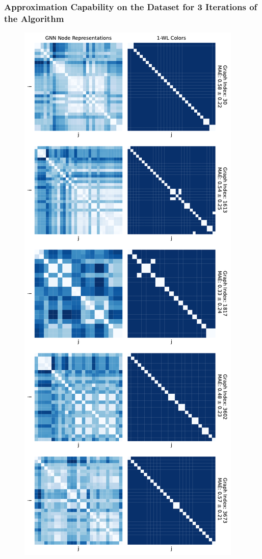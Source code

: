 \subsubsection{Approximation Capability on the \nci Dataset for 3 Iterations of the \wl Algorithm}
\begin{figure}[H]
    \centering
    \begin{minipage}[b]{0.45992852703\textwidth}
        \centering
        \includegraphics[width=\textwidth, left]{Figures/heatmaps_NCI1_0.pdf}

\end{minipage}
\end{figure}
